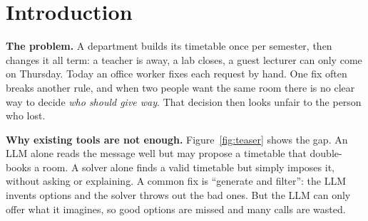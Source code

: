 \documentclass[10pt,a4paper]{article}
\begin{document}
\section{Introduction}
\textbf{The problem.} A department builds its timetable once per semester,
then changes it all term: a teacher is away, a lab closes, a guest lecturer
can only come on Thursday. Today an office worker fixes each request by hand.
One fix often breaks another rule, and when two people want the same room
there is no clear way to decide \emph{who should give way}. That decision
then looks unfair to the person who lost.

\textbf{Why existing tools are not enough.} Figure~\ref{fig:teaser} shows
the gap. An LLM alone reads the message well but may propose a timetable
that double-books a room. A solver alone finds a valid timetable but simply
imposes it, without asking or explaining. A common fix is ``generate and
filter'': the LLM invents options and the solver throws out the bad ones.
But the LLM can only offer what it imagines, so good options are missed and
many calls are wasted.
\end{document}
